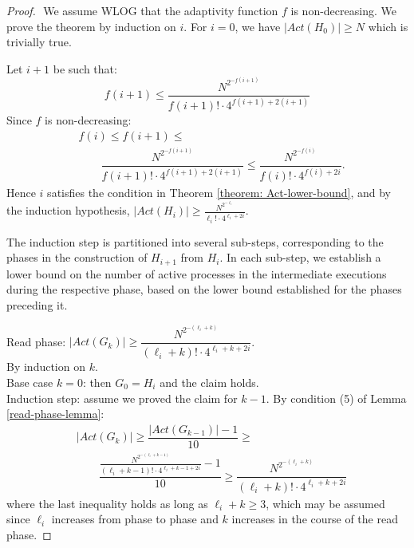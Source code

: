 \begin{proof}
	$ $ \newline
We assume WLOG that the adaptivity function $f$ is non-decreasing. We prove the theorem by induction on $i$. For $i=0$, we have $|Act(H_0)| \geq N$ which is trivially true.

Let $i+1$ be such that:
 $$f(i+1) \leq \dfrac{N^{2^{-f(i+1)}}} {f(i+1)! \cdot 4^{f(i+1) + 2(i+1)}}$$
 Since $f$ is non-decreasing:
\begin{align*}
	& f(i) \leq f(i+1) \leq \\
	& \qquad \dfrac{N^{2^{-f(i+1)}}} {f(i+1)! \cdot 4^{f(i+1)+2(i+1)}} \leq \dfrac{N^{2^{-f(i)}}} {f(i)! \cdot 4^{f(i)+2i}}.
\end{align*}
Hence $i$ satisfies the condition in Theorem \ref{theorem: Act-lower-bound}, and by the induction hypothesis, $|Act(H_i)| \geq \frac{N^{2^{-\ell_i}}}{\ell_i! \cdot 4^{\ell_i+2i}}$.
	
The induction step is partitioned into several sub-steps, corresponding to the phases in the construction of $H_{i+1}$ from $H_i$. In each sub-step, we establish a lower bound on the number of active processes in the intermediate executions during the respective phase, based on the lower bound established for the phases preceding it.
	
	Read phase: $|Act(G_k)| \geq \dfrac{N^{2^{-(\ell_i+k)}}}{(\ell_i+k)! \cdot 4^{\ell_i+k+2i}}$.
	\\ By induction on $k$.
	\\ Base case $k=0$: then $G_0 = H_i$ and the claim holds.
	\\ Induction step: assume we proved the claim for $k-1$. By condition (5) of Lemma \ref{read-phase-lemma}:
	\begin{align*}
	& |Act(G_k)| \geq \dfrac{|Act(G_{k-1})|-1}{10} \geq \\
	& \qquad \dfrac{\frac{N^{2^{-(\ell_i+k-1)}}}{(\ell_i+k-1)! \cdot 4^{\ell_i+k-1+2i}}-1}{10} \geq \dfrac{N^{2^{-(\ell_i+k)}}}{(\ell_i+k)! \cdot 4^{\ell_i+k+2i}}
	\end{align*}
	where the last inequality holds as long as $\ell_i+k \geq 3$, which may be assumed since $\ell_i$ increases from phase
    to phase and $k$ increases in the course of the read phase.
	

\end{proof}
